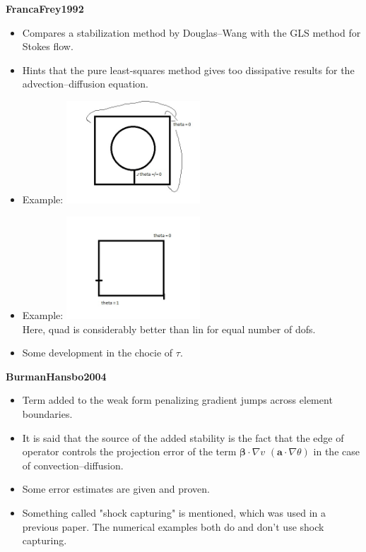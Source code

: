 \documentclass{article}
\newcommand{\bs}[1]{\boldsymbol{#1}}
\begin{document}
\textbf{FrancaFrey1992}
\begin{itemize}
\item Compares a stabilization method by Douglas--Wang with the GLS method for Stokes flow.
\item Hints that the pure least-squares method gives too dissipative results for the advection--diffusion equation.
\item Example: \includegraphics[width=5cm]{figures/FrancaFrey1992_img1.jpg}
\item Example: \includegraphics[width=5cm]{figures/FrancaFrey1992_img2.jpg}\\
Here, quad is considerably better than lin for equal number of dofs.
\item Some development in the chocie of $\tau$.
\end{itemize}

\textbf{BurmanHansbo2004}
\begin{itemize}
\item Term added to the weak form penalizing gradient jumps across element boundaries.
\item It is said that the source of the added stability is the fact that the edge of operator controls the projection error of the term $\bs{\beta}\cdot\nabla v$ $(\bs{a}\cdot\nabla\theta)$ in the case of convection--diffusion.
\item Some error estimates are given and proven.
\item Something called "shock capturing" is mentioned, which was used in a previous paper. The numerical examples both do and don't use shock capturing.
\end{itemize}
\end{document}
